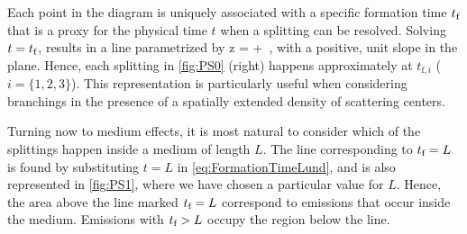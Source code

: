 Each point in the diagram is uniquely associated with a specific formation time $t_\text{f}$ that is a proxy for the physical time $t$ when a splitting can be resolved.
Solving $t = t_\text{f}$, results in a line parametrized by
\beq
\label{eq:FormationTimeLund}
\log z \theta = \log {} + \log {} \,,
\eeq
with a positive, unit slope in the plane.
Hence, each splitting in \autoref{fig:PS0} (right) happens approximately at $t_{\text{f},i}$ ($i=\{1,2,3\}$). This representation is particularly useful when considering branchings in the presence of a spatially extended density of scattering centers.

Turning now to medium effects, it is most natural to consider which of the splittings happen inside a medium of length $L$.  The line corresponding to $t_\text{f} = L$ is found by substituting $t = L$ in \eqref{eq:FormationTimeLund}, and is also represented in \autoref{fig:PS1}, where we have chosen a particular value for $L$. Hence, the area above the line marked $t_\text{f} = L$ correspond to emissions that occur inside the medium. Emissions with $t_\text{f} > L$ occupy the region below the line.

